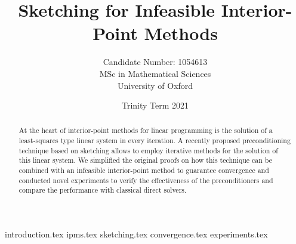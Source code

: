 \documentclass[a4paper, 12pt, egregdoesnotlikesansseriftitles, notitlepage, abstract]{scrreprt}
\title{Sketching for Infeasible Interior-Point Methods}
\author{Candidate Number: 1054613 \\ MSc in Mathematical Sciences \\ University of Oxford}
\date{Trinity Term 2021}
\begin{document}
\hypersetup{pageanchor=false}

\maketitle

\begin{abstract}
    At the heart of interior-point methods for linear programming is the solution of a least-squares type linear system in every iteration.
    A recently proposed preconditioning technique based on sketching allows to employ iterative methods for the solution of this linear system.
    We simplified the original proofs on how this technique can be combined with an infeasible interior-point method to guarantee convergence and conducted novel experiments to verify the effectiveness of the preconditioners and compare the performance with classical direct solvers.
\end{abstract}

\hypersetup{pageanchor=true}

\tableofcontents

{introduction.tex}
{ipms.tex}
{sketching.tex}
{convergence.tex}
{experiments.tex}

\printbibliography[heading=bibintoc]
\end{document}
